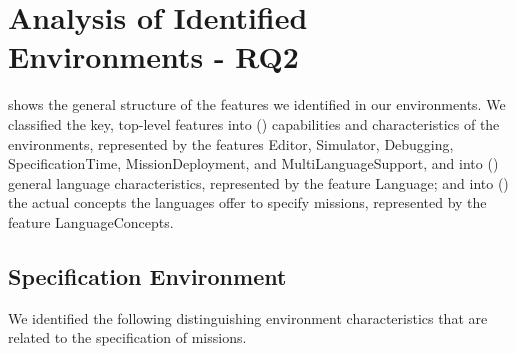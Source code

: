 \newcommand{\f}[1]{\textsf{#1}\xspace}

\newcommand{\flanguage}{\f{Language}}

\newcommand{\feditor}{\f{Editor}}
\newcommand{\fsimulator}{\f{Simulator}}
\newcommand{\fdebugging}{\f{Debugging}}
\newcommand{\fspectime}{\f{SpecificationTime}}
\newcommand{\fdeployment}{\f{MissionDeployment}}
\newcommand{\fmultilang}{\f{MultiLanguageSupport}}


\newcommand{\fsemantics}{\f{Semantics}}
\newcommand{\fnotation}{\f{Notation}}
\newcommand{\flangparadigm}{\f{LanguageParadigm}}
\newcommand{\fextensibility}{\f{Extensibility}}

\newcommand{\flangconcepts}{\f{LanguageConcepts}}


\newcommand{\fflowchart}{\f{FlowChart}}
\newcommand{\fblockly}{\f{Blockly}}


\section {Analysis of Identified Environments - RQ2}

 shows the general structure of the features we identified in our environments. 
We classified the key, top-level features into () capabilities and characteristics of the environments, represented by the features \feditor, \fsimulator, \fdebugging, \fspectime, \fdeployment, and \fmultilang, and into () general language characteristics, represented by the feature \flanguage; and into () the actual concepts the languages offer to specify missions, represented by the feature \flangconcepts.


\subsection{Specification Environment}\label{sec:envfeatures}
\noindent
We identified the following distinguishing environment characteristics that are related to the specification of missions.


